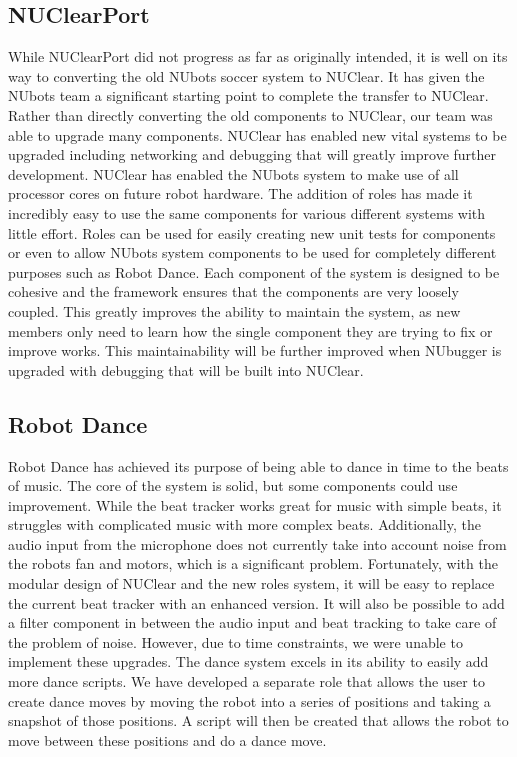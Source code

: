 \documentclass[english,12pt]{scrartcl}
\begin{document}
	\subsection{NUClearPort}
		While NUClearPort did not progress as far as originally intended, it is well on its way to converting the old NUbots soccer system to NUClear.
		It has given the NUbots team a significant starting point to complete the transfer to NUClear.
		Rather than directly converting the old components to NUClear, our team was able to upgrade many components.
		NUClear has enabled new vital systems to be upgraded including networking and debugging that will greatly improve further development.
		NUClear has enabled the NUbots system to make use of all processor cores on future robot hardware.
		The addition of roles has made it incredibly easy to use the same components for various different systems with little effort.
		Roles can be used for easily creating new unit tests for components or even to allow NUbots system components to be used for completely different purposes such as Robot Dance.
		Each component of the system is designed to be cohesive and the framework ensures that the components are very loosely coupled.
		This greatly improves the ability to maintain the system, as new members only need to learn how the single component they are trying to fix or improve works.
		This maintainability will be further improved when NUbugger is upgraded with debugging that will be built into NUClear.

	\subsection{Robot Dance}
		Robot Dance has achieved its purpose of being able to dance in time to the beats of music.
		The core of the system is solid, but some components could use improvement.
		While the beat tracker works great for music with simple beats, it struggles with complicated music with more complex beats.
		Additionally, the audio input from the microphone does not currently take into account noise from the robots fan and motors, which is a significant problem.
		Fortunately, with the modular design of NUClear and the new roles system, it will be easy to replace the current beat tracker with an enhanced version.
		It will also be possible to add a filter component in between the audio input and beat tracking to take care of the problem of noise.
		However, due to time constraints, we were unable to implement these upgrades.
		The dance system excels in its ability to easily add more dance scripts.
		We have developed a separate role that allows the user to create dance moves by moving the robot into a series of positions and taking a snapshot of those positions.
		A script will then be created that allows the robot to move between these positions and do a dance move.
\end{document}
